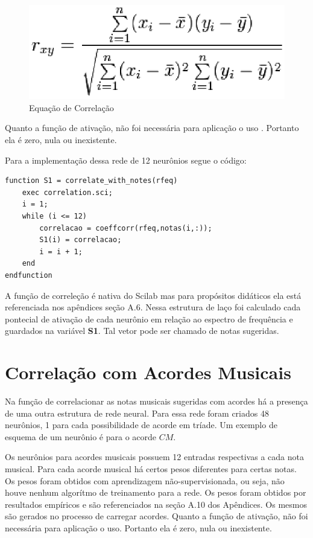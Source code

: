 \begin{figure}[h]
	\centering
		\includegraphics[keepaspectratio=true,scale=0.7]{figuras/correlation-formula}
	\caption{Equação de Correlação}
\end{figure}

Quanto a função de ativação, não foi necessária para aplicação o uso
. Portanto ela é zero, nula ou inexistente.

Para a implementação dessa rede de 12 neurônios segue o código:
\begin{lstlisting} 
function S1 = correlate_with_notes(rfeq)
	exec correlation.sci;
	i = 1;
	while (i <= 12)
	    correlacao = coeffcorr(rfeq,notas(i,:));
	    S1(i) = correlacao;    
	    i = i + 1;
	end
endfunction
\end{lstlisting}

A função de correleção é nativa do Scilab mas para propósitos didáticos ela está referenciada nos apêndices seção A.6. Nessa estrutura de laço foi calculado cada pontecial de ativação de cada neurônio em relação ao espectro de frequência e guardados na variável \textbf{S1}. Tal vetor pode ser chamado de notas sugeridas.

\section{Correlação com Acordes Musicais}
\label{sec:correlacaoacordes}

Na função de correlacionar as notas musicais sugeridas com acordes há a presença de uma outra estrutura de rede neural. Para essa rede foram criados 48 neurônios, 1 para cada possibilidade de acorde em tríade. Um exemplo de esquema de um neurônio é para o acorde $CM$. 

Os neurônios para acordes musicais possuem 12 entradas respectivas a cada nota musical. Para cada acorde musical há certos pesos diferentes para certas notas. Os pesos foram obtidos com aprendizagem não-supervisionada, ou seja, não houve nenhum algorítmo de treinamento para a rede. Os pesos foram obtidos por resultados empíricos e são referenciados na seção A.10 dos Apêndices. Os mesmos são gerados no processo de carregar acordes. Quanto a função de ativação, não foi necessária para aplicação o uso. Portanto ela é zero, nula ou inexistente.

